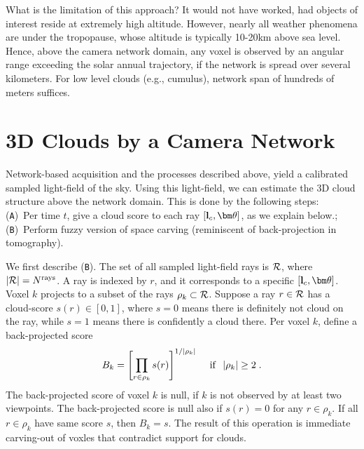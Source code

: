 \documentclass[runningheads]{llncs}
\begin{document}
What is the limitation of this approach? It would not have worked, had objects of interest reside at extremely high altitude. However, nearly all weather phenomena are under the tropopause, whose altitude is typically 10-20km above sea level. Hence, above the camera network domain, any voxel is observed by an angular range exceeding the solar annual trajectory, if the network is spread over several kilometers. For low level clouds (e.g., cumulus), network span of hundreds of meters suffices.


\section{3D Clouds by a Camera Network}
\label{sec:mutiradio}

Network-based acquisition and the processes described above, yield a calibrated sampled light-field of the sky. Using this light-field, we can estimate the 3D cloud structure above the network domain. This is done by the following steps:~ %
({\tt A})~Per time $t$, give a {\rm cloud score} to each ray $[{\bf l}_c,{\bm \theta}]$, as we explain below.;~ ({\tt B})~Perform fuzzy version of space carving (reminiscent of back-projection in tomography).

We first describe ({\tt B}).  The set of all sampled light-field rays is ${\cal R}$, where
\mbox{$|{\cal R}|=N^{\rm rays}$}. A ray is indexed by $r$, and it corresponds to a specific $[{\bf l}_c,{\bm \theta}]$. Voxel $k$ projects to a subset of the rays $\rho_k\subset{\cal R}$. Suppose a ray
$r\in{\cal R}$ has a cloud-score $s(r)\in[0,1]$, where $s=0$ means there is definitely not cloud on the ray, while $s=1$ means there is confidently a cloud there. Per voxel $k$, define a back-projected score \begin{equation}
 B_k= \left[ \prod_{r\in\rho_k} s(r)\right]^{1/|\rho_k|}
 \;\; ~~{\rm if}~~ |\rho_k|\geq 2
  \;.
 \label{eq:Bk}
\end{equation}
The back-projected score of voxel $k$ is null, if $k$ is not observed by at least two viewpoints. The back-projected score is null also if $s(r)=0$ for any $r\in\rho_k$. If all $r\in\rho_k$ have same score $s$, then $B_k=s$. The result of this operation is immediate carving-out of voxles that contradict  support for clouds.
\end{document}

